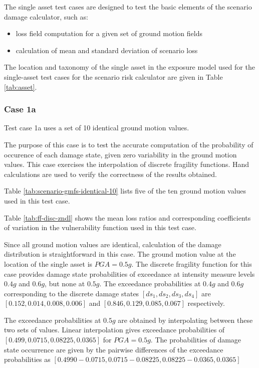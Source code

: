 The single asset test cases are designed to test the basic elements of the scenario damage calculator, such as:

\begin{itemize}
\item loss field computation for a given set of ground motion fields
\item calculation of mean and standard deviation of scenario loss
\end{itemize}

The location and taxonomy of the single asset in the exposure model used for the single-asset test cases for the scenario risk calculator are given in Table \ref{tab:asset}.

\subsubsection{Case 1a}
Test case 1a uses a set of 10 identical ground motion values.

The purpose of this case is to test the accurate computation of the probability of occurence of each damage state, given zero variability in the ground motion values. This case exercises the interpolation of discrete fragility functions. Hand calculations are used to verify the correctness of the results obtained.



Table \ref{tab:scenario-gmfs-identical-10} lists five of the ten ground motion values used in this test case.



Table \ref{tab:ff-disc-zndl} shows the mean loss ratios and corresponding coefficients of variation in the vulnerability function used in this test case.

Since all ground motion values are identical, calculation of the damage distribution is straightforward in this case. The ground motion value at the location of the single asset is $PGA = 0.5 g$. The discrete fragility function for this case provides damage state probabilities of exceedance at intensity measure levels $0.4 g$ and $0.6 g$, but none at $0.5 g$. The exceedance probabilities at $0.4 g$ and $0.6 g$ corresponding to the discrete damage states $[ds_1, ds_2, ds_3, ds_4]$ are $[0.152, 0.014, 0.008, 0.006]$ and $[0.846, 0.129, 0.085, 0.067]$ respectively.

The exceedance probabilities at $0.5 g$ are obtained by interpolating between these two sets of values. Linear interpolation gives exceedance probabilities of $[0.499, 0.0715, 0.08225, 0.0365]$ for $PGA = 0.5 g$. The probabilities of damage state occurrence are given by the pairwise differences of the exceedance probabilities as $[0.4990 - 0.0715, 0.0715 - 0.08225, 0.08225 - 0.0365, 0.0365]$

